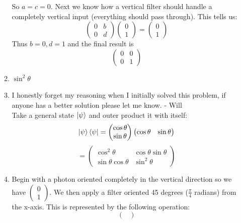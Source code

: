 \documentclass[12pt]{article}
\begin{document}
\begin{enumerate}[font=\bfseries]
\begin{enumerate}
\[        \]
        So $a = c = 0$. Next we know how a vertical filter should handle a completely vertical input (everything should pass through). This tells us:
        \[
        \begin{pmatrix}
            0 & b \\ 0 & d
        \end{pmatrix}
        \begin{pmatrix}
        0\\ 1
        \end{pmatrix}
        =
        \begin{pmatrix}
        0\\ 1
        \end{pmatrix}
        \]
        Thus $b = 0, d = 1$ and the final result is
        \[\begin{pmatrix}
                0 & 0 \\
                0 & 1
                \end{pmatrix}\]
        \item  $\sin^2{\theta}$
        \item I honestly forget my reasoning when I initially solved this problem, if anyone has a better solution please let me know. - Will
        \\
        Take a general state $\ket{\psi}$ and outer product it with itself:
        \[
        \ket{\psi}\bra{\psi} = 
        \begin{pmatrix}
        \cos{\theta} \\ \sin{\theta}
        \end{pmatrix}
        \begin{pmatrix}
        \cos{\theta} & \sin{\theta}
        \end{pmatrix}
        \]
        \[
        = \begin{pmatrix}
                \cos^2{\theta} & \cos{\theta}\sin{\theta} \\
                \sin{\theta}\cos{\theta} & \sin^2{\theta}
                \end{pmatrix}
        \]
        \item Begin with a photon oriented completely in the vertical direction so we have $\begin{pmatrix} 0 \\ 1 \end{pmatrix}$. We then apply a filter oriented 45 degrees ($\frac{\pi}{4}$ radians) from the x-axis. This is represented by the following operation:
        \[\begin{pmatrix}

\end{pmatrix}\]
\end{enumerate}
\end{enumerate}
\end{document}
